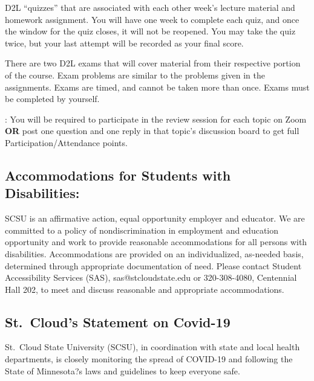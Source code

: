 \documentclass{tufte-handout}
\begin{document}
\begin{fullwidth}

  D2L ``quizzes'' that are associated with each other week's lecture material and homework assignment. You will have one week to complete each quiz, and once the window for the quiz closes, it will not be reopened. You may take the quiz twice, but your last attempt will be recorded as your final score.



 There are two D2L exams that will cover material from their respective portion of the course. Exam problems are similar to the problems given in the assignments. Exams are timed, and cannot be taken more than once. Exams must be completed by yourself.



: You will be required to participate in the review session for each topic on Zoom \textbf{OR} post one question and one reply in that topic's discussion board to get full Participation/Attendance points. 



\subsection{Accommodations for Students with Disabilities: } 

SCSU is an affirmative action, equal opportunity employer and educator. We are committed to a policy of nondiscrimination in employment and education opportunity and work to provide reasonable accommodations for all persons with disabilities. Accommodations are provided on an individualized, as-needed basis, determined through appropriate documentation of need. Please contact Student Accessibility Services (SAS), sas@stcloudstate.edu or 320-308-4080, Centennial Hall 202, to meet and discuss reasonable and appropriate accommodations. 






\newpage



\subsection*{St.\ Cloud's Statement on Covid-19}

St.\ Cloud State University (SCSU), in coordination with state and local health departments, is closely monitoring the spread of COVID-19 and following the State of Minnesota?s laws and guidelines to keep everyone safe.


\end{fullwidth}
\end{document}
